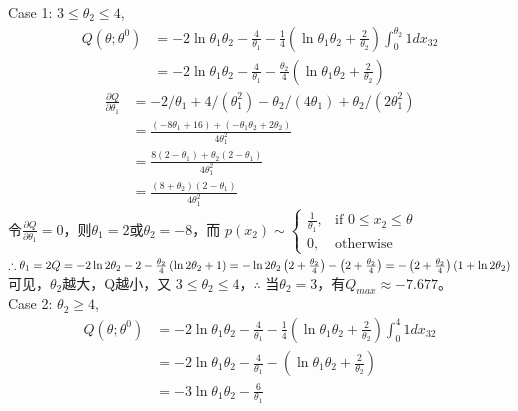 \documentclass[a4paper,11pt,onecolumn,oneside,UTF8]{article}
\begin{document}
Case 1: $3\leq\theta_2\leq4$,
$$
    \begin{aligned}
        Q\left(\theta;\theta^0\right)
         & = -2\ln\theta_1\theta_2-\frac{4}{\theta_1}-\frac{1}{4}\left(\ln\theta_1\theta_2+\frac{2}
        {\theta_2}\right)\int_{0}^{\theta_2}1dx_{32}                                                       \\
         & = -2\ln\theta_1\theta_2-\frac{4}{\theta_1}-\frac{\theta_2}{4}\left(\ln\theta_1\theta_2+\frac{2}
        {\theta_2}\right)
    \end{aligned}
$$
$$
    \begin{aligned}
        \frac{\partial Q}{\partial \theta_1}
         & = -2/\theta_1+4/\left(\theta_1^2\right)-\theta_2/\left(4\theta_1\right)+
        \theta_2/\left(2\theta_1^2\right)                                                            \\
         & = \frac{\left(-8\theta_1+16\right)+\left(-\theta_1\theta_2+2\theta_2\right)}{4\theta_1^2} \\
         & = \frac{8\left(2-\theta_1\right)+\theta_2\left(2-\theta_1\right)}{4\theta_1^2}            \\
         & = \frac{\left(8+\theta_2\right)\left(2-\theta_1\right)}{4\theta_1^2}
    \end{aligned}
$$
令$\frac{\partial Q}{\partial \theta_1} = 0$，则$\theta_1=2$或$\theta_2=-8$，而
$
    p \left(x_2\right) \sim
    \begin{cases}
        \frac{1}{\theta_1}, & \mbox{if }0\leq x_2\leq\theta \\
        0,                  & \mbox{otherwise}
    \end{cases}
$
$\therefore \theta_1=2 \\
    Q = -2\ln 2\theta_2-2-\frac{\theta_2}{4}\left(\ln 2\theta_2+1\right)
    = -\ln 2\theta_2\left(2+\frac{\theta_2}{4}\right)-\left(2+\frac{\theta_2}{4}\right)
    = -\left(2+\frac{\theta_2}{4}\right)\left(1+\ln 2\theta_2\right)
$ \\
可见，$\theta_2$越大，Q越小，又 $3\leq\theta_2\leq4$，$\therefore$ 当$\theta_2=3$，有$Q_{max} \approx -7.677$。\\
Case 2: $\theta_2\geq 4$,
$$
    \begin{aligned}
        Q\left(\theta;\theta^0\right)
         & = -2\ln\theta_1\theta_2-\frac{4}{\theta_1}-\frac{1}{4}\left(\ln\theta_1\theta_2+\frac{2}
        {\theta_2}\right)\int_{0}^{4}1dx_{32}                                                       \\
         & = -2\ln\theta_1\theta_2-\frac{4}{\theta_1}-\left(\ln\theta_1\theta_2+\frac{2}
        {\theta_2}\right)                                                                           \\
         & = -3\ln\theta_1\theta_2-\frac{6}{\theta_1}
    \end{aligned}
$$
\end{document}
